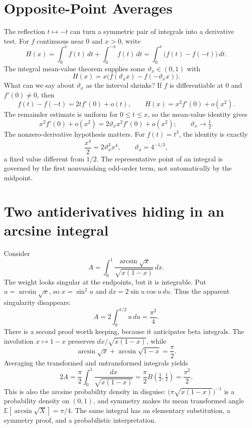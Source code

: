 \section{Opposite-Point Averages}

The reflection $t\mapsto -t$ can turn a symmetric pair of integrals into a derivative test. For $f$ continuous near $0$ and $x>0$, write
\[
 H(x)=\int_0^x f(t)\,dt+\int_0^{-x}f(t)\,dt
     =\int_0^x\bigl(f(t)-f(-t)\bigr)\,dt.
\]
The integral mean-value theorem supplies some $\vartheta_x\in(0,1)$ with
\[
 H(x)=x\bigl(f(\vartheta_xx)-f(-\vartheta_xx)\bigr).
\]
What can we say about $\vartheta_x$ as the interval shrinks? If $f$ is differentiable at $0$ and $f'(0)\ne0$, then
\[
 f(t)-f(-t)=2tf'(0)+o(t),\qquad
 H(x)=x^2f'(0)+o(x^2).
\]
The remainder estimate is uniform for $0\le t\le x$, so the mean-value identity gives
\[
 x^2f'(0)+o(x^2)
   =2\vartheta_xx^2f'(0)+o(x^2);
 \qquad\boxed{\vartheta_x\longrightarrow\tfrac12}.
\]
The nonzero-derivative hypothesis matters. For $f(t)=t^3$, the identity is exactly
\[
 \frac{x^4}{2}=2\vartheta_x^3x^4,
 \qquad \vartheta_x=4^{-1/3},
\]
a fixed value different from $1/2$. The representative point of an integral is governed by the first nonvanishing odd-order term, not automatically by the midpoint.

\section{Two antiderivatives hiding in an arcsine integral}

Consider
\[
 A=\int_0^1
  \frac{\arcsin\sqrt{x}}{\sqrt{x(1-x)}}\,dx.
\]
The weight looks singular at the endpoints, but it is integrable. Put
$u=\arcsin\sqrt{x}$, so $x=\sin^2u$ and
$dx=2\sin u\cos u\,du$. Thus the apparent singularity disappears:
\[
 A=2\int_0^{\pi/2}u\,du
   =\boxed{\frac{\pi^2}{4}}.
\]
There is a second proof worth keeping, because it anticipates beta integrals. The involution $x\mapsto1-x$ preserves
$dx/\sqrt{x(1-x)}$, while
\[
 \arcsin\sqrt{x}+\arcsin\sqrt{1-x}=\frac\pi2.
\]
Averaging the transformed and untransformed integrals yields
\[
 2A=\frac\pi2\int_0^1\frac{dx}{\sqrt{x(1-x)}}
    =\frac\pi2 B\left(\tfrac12,\tfrac12\right)
    =\frac{\pi^2}{2}.
\]
This is also the arcsine probability density in disguise:
$\bigl(\pi\sqrt{x(1-x)}\bigr)^{-1}$ is a probability density on $(0,1)$, and symmetry makes its mean transformed angle
$\mathbb E[\arcsin\sqrt{X}]=\pi/4$. The same integral has an elementary substitution, a symmetry proof, and a probabilistic interpretation.

